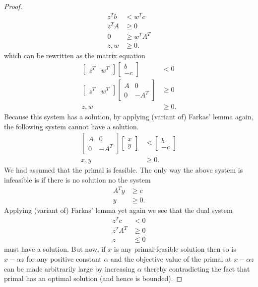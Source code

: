 \documentclass[
]{book}
\theoremstyle{definition}
\theoremstyle{definition}
\theoremstyle{definition}
\theoremstyle{definition}
\theoremstyle{remark}
\begin{document}
\begin{proof}
\begin{align*}
    z^T b & < w^T c \\
    z^T A & \ge 0 \\
    0 & \ge w^T A^T \\
    z, w & \ge 0.
\end{align*}
which can be rewritten as the matrix equation
\begin{align*}
  \begin{bmatrix} z^T & w^T \end{bmatrix}
  \begin{bmatrix} b \\ -c \end{bmatrix} & < 0 \\
  \begin{bmatrix} z^T & w^T \end{bmatrix}
    \begin{bmatrix} A & 0 \\ 0 & -A^T \end{bmatrix}
    & \ge 0\\
  z, w & \ge 0.
\end{align*}
Because this system has a solution, by applying (variant of) Farkas' lemma again, the following system cannot have a solution.
\begin{align*}
    \begin{bmatrix} A & 0 \\ 0 & -A^T \end{bmatrix}
    \begin{bmatrix} x \\ y  \end{bmatrix}
      & \le 
    \begin{bmatrix} b \\ -c \end{bmatrix} \\
    x, y & \ge 0.
\end{align*}
We had assumed that the primal is feasible. The only way the above system is infeasible is if there is no solution no the system
\begin{align*}
  A^T y &\ge c \\
  y &\ge 0.
\end{align*}
Applying (variant of) Farkas' lemma yet again we see that the dual system
\begin{align*}
  z^T c & < 0\\
  z^T A^T &\ge 0 \\ 
  z &\le 0
\end{align*}
must have a solution.
But now, if \(x\) is any primal-feasible solution then so is \(x - \alpha z\) for any positive constant \(\alpha\) and the objective value of the primal at \(x - \alpha z\) can be made arbitrarily large by increasing \(\alpha\) thereby contradicting the fact that primal has an optimal solution (and hence is bounded).
\end{proof}
\end{document}
